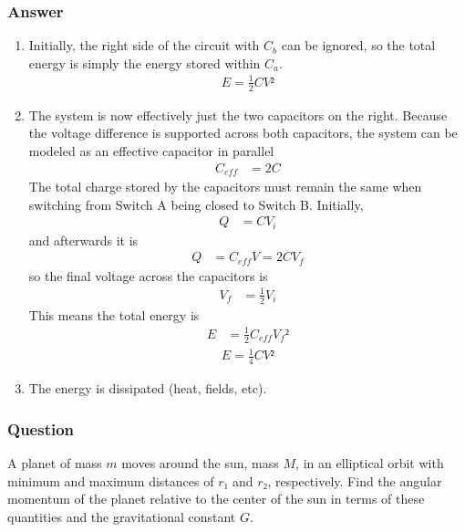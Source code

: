 \subsubsection{Answer}
\begin{enumerate}
	\item
		Initially, the right side of the circuit with $C_b$ can be ignored,
		so the total energy is simply the energy stored within $C_a$.
		\begin{align}
			\boxed{
			E = \frac 12 CV²
			}
		\end{align}
	\item
		The system is now effectively just the two capacitors on the right.
		Because the voltage difference is supported across both capacitors,
		the system can be modeled as an effective capacitor in parallel
		\begin{align*}
			C_{eff} &= 2C
		\end{align*}
		The total charge stored by the capacitors must remain the same when
		switching from Switch A being closed to Switch B. Initially,
		\begin{align*}
			Q &= CV_i
		\end{align*}
		and afterwards it is
		\begin{align*}
			Q &= C_{eff}V = 2CV_f
		\end{align*}
		so the final voltage across the capacitors is
		\begin{align*}
			V_f &= \frac 12 V_i
		\end{align*}
		This means the total energy is
		\begin{align*}
			E &= \frac 12 C_{eff} {V_f}²
		\end{align*}
		\begin{align}
			\boxed{
			E = \frac 14 CV²
			}
		\end{align}
	\item
		The energy is dissipated (heat, fields, etc).
\end{enumerate}

\subsubsection{Question}

A planet of mass $m$ moves around the sun, mass $M$, in an elliptical orbit
with minimum and maximum distances of $r₁$ and $r₂$, respectively. Find the
angular momentum of the planet relative to the center of the sun in terms of
these quantities and the gravitational constant $G$.


